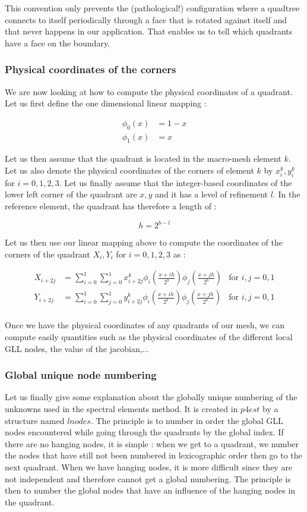 This convention only prevents the (pathological!) configuration where a quadtree connects to itself periodically through a face that is rotated against itself and that never happens in our application. That enables us to tell which quadrants have a face on the boundary. 

\subsubsection{Physical coordinates of the corners}

We are now looking at how to compute the physical coordinates of a quadrant. Let us first define the one dimensional linear mapping : 

\begin{align*}
\phi_0(x) &= 1-x\\
\phi_1(x) &= x
\end{align*}

Let us then assume that the quadrant is located in the macro-mesh element $k$. Let us also denote the physical coordinates of the corners of element $k$ by $x^k_i,y^k_i$ for $i=0,1,2,3$. Let us finally assume that the integer-based coordinates of the lower left corner of the quadrant are $x,y$ and it has a level of refinement $l$. In the reference element, the quadrant has therefore a length of :

$$ h = 2^{b-l} $$ 

Let us then use our linear mapping above to compute the coordinates of the corners of the quadrant $X_i,Y_i$ for $i=0,1,2,3$ as : 

\begin{align*}
X_{i+2j} &= \sum_{i=0}^1\sum_{j=0}^1 x^k_{i+2j} \phi_i(\frac{x+ih}{2^b})\phi_j(\frac{x+jh}{2^b}) &\text{for $i,j=0,1$}\\ 
Y_{i+2j} &= \sum_{i=0}^1\sum_{j=0}^1 y^k_{i+2j} \phi_i(\frac{x+ih}{2^b})\phi_j(\frac{x+jh}{2^b}) &\text{for $i,j=0,1$}\\ 
\end{align*}


Once we have the physical coordinates of any quadrants of our mesh, we can compute easily quantities such as the physical coordinates of the different local GLL nodes, the value of the jacobian,...

\subsubsection{Global unique node numbering}

Let us finally give some explanation about the globally unique numbering of the unknowns used in the spectral elements method. It is created in $p4est$ by a structure named $lnodes$. The principle is to number in order the global GLL nodes encountered while going through the quadrants by the global index. If there are no hanging nodes, it is simple : when we get to a quadrant, we number the nodes that have still not been numbered in lexicographic order then go to the next quadrant. When we have hanging nodes, it is more difficult since they are not independent and therefore cannot get a global numbering. The principle is then to number the global nodes that have an influence of the hanging nodes in the quadrant. 

